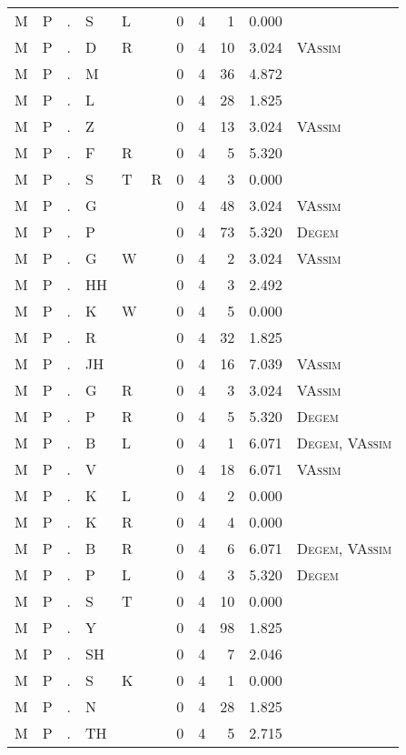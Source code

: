 \begin{longtable}{r@{ } r@{ } c@{ } l@{ } l@{ } l@{ } r r r r l }
M & P & . & S & L &  & 0 & 4 & 1 & 0.000 &  \\
M & P & . & D & R &  & 0 & 4 & 10 & 3.024 & \textsc{VAssim} \\
M & P & . & M &  &  & 0 & 4 & 36 & 4.872 &  \\
M & P & . & L &  &  & 0 & 4 & 28 & 1.825 &  \\
M & P & . & Z &  &  & 0 & 4 & 13 & 3.024 & \textsc{VAssim} \\
M & P & . & F & R &  & 0 & 4 & 5 & 5.320 &  \\
M & P & . & S & T & R & 0 & 4 & 3 & 0.000 &  \\
M & P & . & G &  &  & 0 & 4 & 48 & 3.024 & \textsc{VAssim} \\
M & P & . & P &  &  & 0 & 4 & 73 & 5.320 & \textsc{Degem} \\
M & P & . & G & W &  & 0 & 4 & 2 & 3.024 & \textsc{VAssim} \\
M & P & . & HH &  &  & 0 & 4 & 3 & 2.492 &  \\
M & P & . & K & W &  & 0 & 4 & 5 & 0.000 &  \\
M & P & . & R &  &  & 0 & 4 & 32 & 1.825 &  \\
M & P & . & JH &  &  & 0 & 4 & 16 & 7.039 & \textsc{VAssim} \\
M & P & . & G & R &  & 0 & 4 & 3 & 3.024 & \textsc{VAssim} \\
M & P & . & P & R &  & 0 & 4 & 5 & 5.320 & \textsc{Degem} \\
M & P & . & B & L &  & 0 & 4 & 1 & 6.071 & \textsc{Degem}, \textsc{VAssim} \\
M & P & . & V &  &  & 0 & 4 & 18 & 6.071 & \textsc{VAssim} \\
M & P & . & K & L &  & 0 & 4 & 2 & 0.000 &  \\
M & P & . & K & R &  & 0 & 4 & 4 & 0.000 &  \\
M & P & . & B & R &  & 0 & 4 & 6 & 6.071 & \textsc{Degem}, \textsc{VAssim} \\
M & P & . & P & L &  & 0 & 4 & 3 & 5.320 & \textsc{Degem} \\
M & P & . & S & T &  & 0 & 4 & 10 & 0.000 &  \\
M & P & . & Y &  &  & 0 & 4 & 98 & 1.825 &  \\
M & P & . & SH &  &  & 0 & 4 & 7 & 2.046 &  \\
M & P & . & S & K &  & 0 & 4 & 1 & 0.000 &  \\
M & P & . & N &  &  & 0 & 4 & 28 & 1.825 &  \\
M & P & . & TH &  &  & 0 & 4 & 5 & 2.715 &  \\

\end{longtable}
